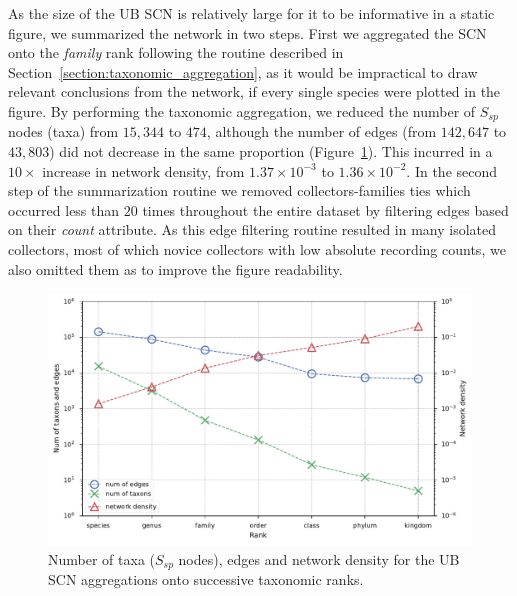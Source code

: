 As the size of the UB SCN is relatively large for it to be informative in a static figure, we summarized the network in two steps.
First we aggregated the SCN onto the \textit{family} rank following the routine described in Section~\ref{section:taxonomic_aggregation}, as it would be impractical to draw relevant conclusions from the network, if every single species were plotted in the figure.
By performing the taxonomic aggregation, we reduced the number of $S_{sp}$ nodes (taxa) from $15,344$ to $474$, although the number of edges (from $142,647$ to $43,803$) did not decrease in the same proportion (Figure~\ref{fig:ub_scn_tax_agg_curves}).
This incurred in a $10 \times$ increase in network density, from $1.37\times 10^{-3}$ to $1.36\times 10^{-2}$.
In the second step of the summarization routine we removed collectors-families ties which occurred less than $20$ times throughout the entire dataset by filtering edges based on their \textit{count} attribute.
As this edge filtering routine resulted in many isolated collectors, most of which novice collectors with low absolute recording counts, we also omitted them as to improve the figure readability.

\begin{figure}[!ht]
  	\centering
    \includegraphics[width=\linewidth]{figures/casestudy_ub/scn_tax_agg_curves.pdf}
    \caption[Number of taxa, edges and network density for the UB SCN aggregations onto successive taxonomic ranks]{Number of taxa ($S_{sp}$ nodes), edges and network density for the UB SCN aggregations onto successive taxonomic ranks.}
    \label{fig:ub_scn_tax_agg_curves}
  \end{figure}

